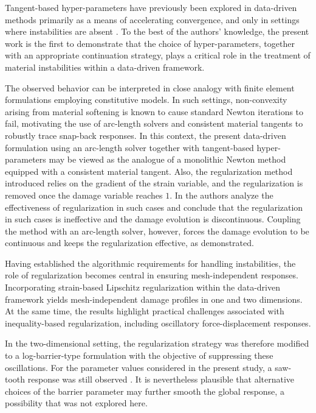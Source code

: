 \documentclass[10pt]{cas-sc}
\begin{document}
Tangent-based hyper-parameters have previously been explored in data-driven methods primarily as a means of accelerating convergence, and only in settings where instabilities are absent \cite{Pham2023,Nguyen2022,Kanno2019}. To the best of the authors’ knowledge, the present work is the first to demonstrate that the choice of hyper-parameters, together with an appropriate continuation strategy, plays a critical role in the treatment of material instabilities within a data-driven framework.

The observed behavior can be interpreted in close analogy with finite element formulations employing constitutive models. In such settings, non-convexity arising from material softening is known to cause standard Newton iterations to fail, motivating the use of arc-length solvers and consistent material tangents to robustly trace snap-back responses. In this context, the present data-driven formulation using an arc-length solver together with tangent-based hyper-parameters may be viewed as the analogue of a monolithic Newton method equipped with a consistent material tangent. Also, the regularization method introduced relies on the gradient of the strain variable, and the regularization is removed once the damage variable reaches $1$. In \cite{le2018strain} the authors analyze the effectiveness of regularization in such cases and conclude that the regularization in such cases is ineffective and the damage evolution is discontinuous. Coupling the method with an arc-length solver, however, forces the damage evolution to be continuous and keeps the regularization effective, as demonstrated.

Having established the algorithmic requirements for handling instabilities, the role of regularization becomes central in ensuring mesh-independent responses. Incorporating strain-based Lipschitz regularization within the data-driven framework yields mesh-independent damage profiles in one and two dimensions. At the same time, the results highlight practical challenges associated with inequality-based regularization, including oscillatory force-displacement responses.

In the two-dimensional setting, the regularization strategy was therefore modified to a log-barrier-type formulation with the objective of suppressing these oscillations. For the parameter values considered in the present study, a saw-tooth response was still observed . It is nevertheless plausible that alternative choices of the barrier parameter may further smooth the global response, a possibility that was not explored here. 
\end{document}
